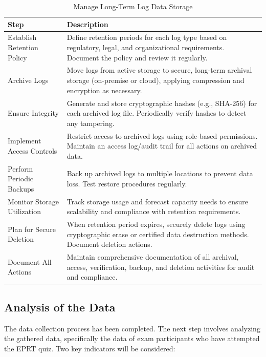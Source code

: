 \begin{table}[H]
	\centering
	\caption{Manage Long-Term Log Data Storage}
	\begin{tabular}{|p{4cm}|p{9cm}|}
		\hline
		\textbf{Step} & \textbf{Description} \\
		\hline
		Establish Retention Policy & Define retention periods for each log type based on regulatory, legal, and organizational requirements. Document the policy and review it regularly. \\
		\hline
		Archive Logs & Move logs from active storage to secure, long-term archival storage (on-premise or cloud), applying compression and encryption as necessary. \\
		\hline
		Ensure Integrity & Generate and store cryptographic hashes (e.g., SHA-256) for each archived log file. Periodically verify hashes to detect any tampering. \\
		\hline
		Implement Access Controls & Restrict access to archived logs using role-based permissions. Maintain an access log/audit trail for all actions on archived data. \\
		\hline
		Perform Periodic Backups & Back up archived logs to multiple locations to prevent data loss. Test restore procedures regularly. \\
		\hline
		Monitor Storage Utilization & Track storage usage and forecast capacity needs to ensure scalability and compliance with retention requirements. \\
		\hline
		Plan for Secure Deletion & When retention period expires, securely delete logs using cryptographic erase or certified data destruction methods. Document deletion actions. \\
		\hline
		Document All Actions & Maintain comprehensive documentation of all archival, access, verification, backup, and deletion activities for audit and compliance. \\
		\hline
	\end{tabular}
	\label{tab:long_term_log_storage}
\end{table}



\subsection{Analysis of the Data}

The data collection process has been completed. The next step involves analyzing the gathered data, specifically the data of exam participants who have attempted the EPRT quiz. Two key indicators will be considered:

